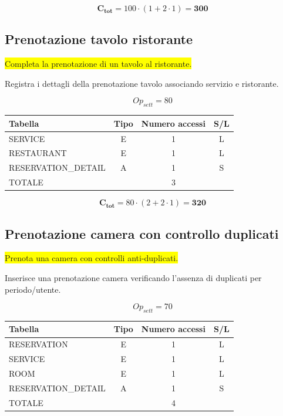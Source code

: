 \documentclass[a4paper,12pt]{report}
\begin{document}
$$\mathbf{C_{tot}} = 100 \cdot (1 + 2 \cdot 1) = \mathbf{300}$$

\subsection*{Prenotazione tavolo ristorante} \label{op14}
\colorbox{yellow}{Completa la prenotazione di un tavolo al ristorante.}

Registra i dettagli della prenotazione tavolo associando servizio e ristorante.

$$Op_{sett} = 80$$

\begin{table}[H]
  \centering
  \small
  \renewcommand{\arraystretch}{1.15}
  \begin{tabularx}{0.8\textwidth}{|X|c|c|c|}
    \hline
    \rowcolor{gray!20}
    \textbf{Tabella} & \textbf{Tipo} & \textbf{Numero accessi} & \textbf{S/L} \\
    \hline
    SERVICE & E & 1 & L \\
    RESTAURANT & E & 1 & L \\
    RESERVATION\_DETAIL & A & 1 & S \\
    \hline
    \rowcolor{gray!20}
    TOTALE & & 3 & \\
    \hline
  \end{tabularx}
  \vspace{-1em}
\end{table}

$$\mathbf{C_{tot}} = 80 \cdot (2 + 2 \cdot 1) = \mathbf{320}$$

\subsection*{Prenotazione camera con controllo duplicati} \label{op15}
\colorbox{yellow}{Prenota una camera con controlli anti-duplicati.}

Inserisce una prenotazione camera verificando l'assenza di duplicati
per periodo/utente.

$$Op_{sett} = 70$$

\begin{table}[H]
  \centering
  \small
  \renewcommand{\arraystretch}{1.15}
  \begin{tabularx}{0.8\textwidth}{|X|c|c|c|}
    \hline
    \rowcolor{gray!20}
    \textbf{Tabella} & \textbf{Tipo} & \textbf{Numero accessi} & \textbf{S/L} \\
    \hline
    RESERVATION & E & 1 & L \\
    SERVICE & E & 1 & L \\
    ROOM & E & 1 & L \\
    RESERVATION\_DETAIL & A & 1 & S \\
    \hline
    \rowcolor{gray!20}
    TOTALE & & 4 & \\
    \hline
  \end{tabularx}
  \vspace{-1em}
\end{table}
\end{document}
